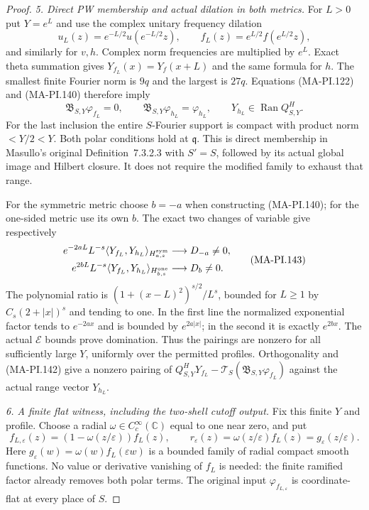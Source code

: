 \begin{proof}
\emph{5. Direct PW membership and actual dilation in both metrics.}
For $L>0$ put $Y=e^L$ and use the complex unitary
frequency dilation
\[
 u_L(z)=e^{-L/2}u(e^{-L/2}z),\qquad
 f_L(z)=e^{L/2}f(e^{L/2}z),
 \tag{MA-PI.141}
\]
and similarly for $v,h$.  Complex norm frequencies
are multiplied by $e^L$.  Exact theta summation gives
$Y_{f_L}(x)=Y_f(x+L)$ and the same formula for $h$.
The smallest finite Fourier norm is $9q$ and the
largest is $27q$.  Equations (MA-PI.122) and
(MA-PI.140) therefore imply
\[
 \mathfrak B_{S,Y}\varphi_{f_L}=0,\qquad
 \mathfrak B_{S,Y}\varphi_{h_L}=\varphi_{h_L},\qquad
 Y_{h_L}\in\operatorname{Ran}Q^H_{S,Y}.
 \tag{MA-PI.142}
\]
For the last inclusion the entire $S$-Fourier support
is compact with product norm $<Y/2<Y$.
Both polar conditions hold at $\mathfrak q$.
This is direct membership in Masullo's original
Definition~7.3.2.3 with $S'=S$, followed by its
actual global image and Hilbert closure.  It does not
require the modified family to exhaust that range.

For the symmetric metric choose $b=-a$ when constructing
(MA-PI.140); for the one-sided metric use its own $b$.
The exact two changes of variable give respectively
\[
 \begin{split}
 e^{-2aL}L^{-s}
     \langle Y_{f_L},Y_{h_L}\rangle_{H^{\rm sym}_{a,s}}
                    &\longrightarrow D_{-a}\ne0,\\
 e^{2bL}L^{-s}
     \langle Y_{f_L},Y_{h_L}\rangle_{H^{\rm one}_{b,s}}
                    &\longrightarrow D_b\ne0.
 \end{split}
 \tag{MA-PI.143}
\]
The polynomial ratio is
$(1+(x-L)^2)^{s/2}/L^s$, bounded for $L\ge1$ by
$C_s(2+|x|)^s$ and tending to one.
In the first line the normalized exponential factor
tends to $e^{-2ax}$ and is bounded by $e^{2a|x|}$;
in the second it is exactly $e^{2bx}$.
The actual $\mathcal E$ bounds prove domination.
Thus the pairings are nonzero for all sufficiently
large $Y$, uniformly over the permitted profiles.
Orthogonality and (MA-PI.142) give a nonzero pairing
of $Q^H_{S,Y}Y_{f_L}
-\mathcal T_S(\mathfrak B_{S,Y}\varphi_{f_L})$
against the actual range vector $Y_{h_L}$.

\emph{6. A finite flat witness, including the two-shell cutoff output.}
Fix this finite $Y$ and profile.  Choose a radial
$\omega\in C_c^\infty(\mathbb C)$ equal to one near zero,
and put
\[
 f_{L,\varepsilon}(z)
       =(1-\omega(z/\varepsilon))f_L(z),\qquad
 r_\varepsilon(z)=\omega(z/\varepsilon)f_L(z)
                        =g_\varepsilon(z/\varepsilon).
 \tag{MA-PI.144}
\]
Here $g_\varepsilon(w)=\omega(w)f_L(\varepsilon w)$
is a bounded family of radial compact smooth functions.
No value or derivative vanishing of $f_L$ is needed:
the finite ramified factor already removes both polar
terms.  The original input
$\varphi_{f_{L,\varepsilon}}$ is coordinate-flat at
every place of $S$.


\end{proof}
